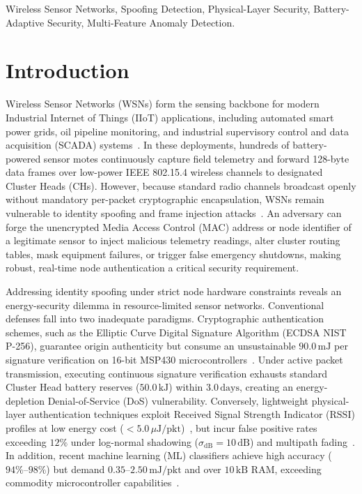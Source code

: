 \documentclass[conference]{IEEEtran}
\begin{document}
\begin{IEEEkeywords}
Wireless Sensor Networks, Spoofing Detection, Physical-Layer Security, Battery-Adaptive Security, Multi-Feature Anomaly Detection.
\end{IEEEkeywords}

\section{Introduction}
\label{sec:intro}

Wireless Sensor Networks (WSNs) form the sensing backbone for modern Industrial Internet of Things (IIoT) applications, including automated smart power grids, oil pipeline monitoring, and industrial supervisory control and data acquisition (SCADA) systems~\cite{ref_iot_survey_01,ref_wsn_ind_02}. In these deployments, hundreds of battery-powered sensor motes continuously capture field telemetry and forward 128-byte data frames over low-power IEEE 802.15.4 wireless channels to designated Cluster Heads (CHs). However, because standard radio channels broadcast openly without mandatory per-packet cryptographic encapsulation, WSNs remain vulnerable to identity spoofing and frame injection attacks~\cite{ref_spoof_survey_07,ref_sybil_08}. An adversary can forge the unencrypted Media Access Control (MAC) address or node identifier of a legitimate sensor to inject malicious telemetry readings, alter cluster routing tables, mask equipment failures, or trigger false emergency shutdowns, making robust, real-time node authentication a critical security requirement.

Addressing identity spoofing under strict node hardware constraints reveals an energy-security dilemma in resource-limited sensor networks. Conventional defenses fall into two inadequate paradigms. Cryptographic authentication schemes, such as the Elliptic Curve Digital Signature Algorithm (ECDSA NIST P-256), guarantee origin authenticity but consume an unsustainable $90.0\,\text{mJ}$ per signature verification on 16-bit MSP430 microcontrollers~\cite{ref_mcu_energy_12,ref_ecc_wsn_10}. Under active packet transmission, executing continuous signature verification exhausts standard Cluster Head battery reserves ($50.0\,\text{kJ}$) within $3.0\,\text{days}$, creating an energy-depletion Denial-of-Service (DoS) vulnerability. Conversely, lightweight physical-layer authentication techniques exploit Received Signal Strength Indicator (RSSI) profiles at low energy cost ($<5.0\,\mu\text{J}/\text{pkt}$)~\cite{ref_yang_rssi_20}, but incur false positive rates exceeding $12\%$ under log-normal shadowing ($\sigma_\text{dB}=10\,\text{dB}$) and multipath fading~\cite{ref_rssi_fading_16}. In addition, recent machine learning (ML) classifiers achieve high accuracy ($94\%\text{--}98\%$) but demand $0.35$--$2.50\,\text{mJ}/\text{pkt}$ and over $10\,\text{kB}$ RAM, exceeding commodity microcontroller capabilities~\cite{ref_jsen_svm_2022,ref_iotj_fedtrust_2024}.
\end{document}
